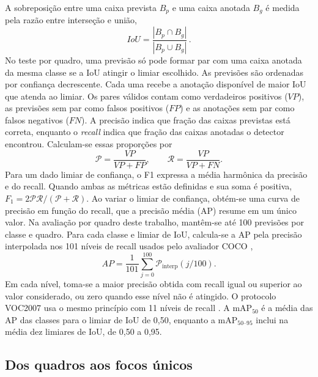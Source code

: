 A sobreposição entre uma caixa prevista $B_p$ e uma caixa anotada $B_g$ é medida pela razão entre interseção e união,
\begin{equation}
  IoU = \frac{|B_p \cap B_g|}{|B_p \cup B_g|}\,.
  \label{eq_iou}
\end{equation}
No teste por quadro, uma previsão só pode formar par com uma caixa anotada da mesma classe se a IoU atingir o limiar escolhido. As previsões são ordenadas por confiança decrescente. Cada uma recebe a anotação disponível de maior IoU que atenda ao limiar. Os pares válidos contam como verdadeiros positivos ($VP$), as previsões sem par como falsos positivos ($FP$) e as anotações sem par como falsos negativos ($FN$). A precisão indica que fração das caixas previstas está correta, enquanto o \textit{recall} indica que fração das caixas anotadas o detector encontrou. Calculam-se essas proporções por
\begin{equation}
  \mathcal{P} = \frac{VP}{VP + FP}, \qquad \mathcal{R} = \frac{VP}{VP + FN}.
  \label{eq_pr}
\end{equation}
Para um dado limiar de confiança, o F1 expressa a média harmônica da precisão e do recall. Quando ambas as métricas estão definidas e sua soma é positiva, $F_1=2\mathcal{P}\mathcal{R}/(\mathcal{P}+\mathcal{R})$. Ao variar o limiar de confiança, obtém-se uma curva de precisão em função do recall, que a precisão média (AP) resume em um único valor. Na avaliação por quadro deste trabalho, mantêm-se até 100 previsões por classe e quadro. Para cada classe e limiar de IoU, calcula-se a AP pela precisão interpolada nos 101 níveis de recall usados pelo avaliador COCO \cite{cocoeval2015},
\begin{equation*}
  AP = \frac{1}{101}\sum_{j=0}^{100}\mathcal{P}_{\mathrm{interp}}(j/100).
\end{equation*}
Em cada nível, toma-se a maior precisão obtida com recall igual ou superior ao valor considerado, ou zero quando esse nível não é atingido. O protocolo VOC2007 usa o mesmo princípio com 11 níveis de recall \cite[p.~313--314]{everingham2010voc}. A mAP$_{50}$ é a média das AP das classes para o limiar de IoU de 0,50, enquanto a mAP$_{50\text{--}95}$ inclui na média dez limiares de IoU, de 0,50 a 0,95.

\subsection{Dos quadros aos focos únicos}

